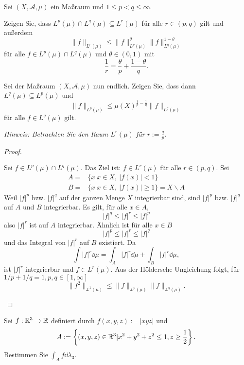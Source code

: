 \begin{Problem}
	Sei $(X, \mathcal{A},\mu)$ ein Maßraum und $1\le p<q\le\infty$.
	\begin{parts}
	\item Zeigen Sie, dass $L^p(\mu)\cap L^q(\mu)\subseteq L^r(\mu)$ f\"{u}r alle $r\in (p,q)$ gilt und außerdem
		\[
			\|f\|_{L^r(\mu)}\le \|f\|_{L^p(\mu)}^\theta \|f\|_{L^q(\mu)}^{1-\theta}
		\] 
		f\"{u}r alle $f\in L^p(\mu)\cap L^q(\mu)$ und $\theta\in (0,1)$ mit
		\[
		\frac{1}{r}=\frac{\theta}{p}+\frac{1-\theta}{q}
		.\] 
	\item Sei der Maßraum $(X,\mathcal{A},\mu)$ nun endlich. Zeigen Sie, dass dann $L^q(\mu)\subseteq L^p(\mu)$ und
		\[
			\|f\|_{L^p(\mu)}\le \mu(X)^{\frac{1}{p}-\frac{1}{q}}\|f\|_{L^q(\mu)}
		\] 
		f\"{u}r alle $f\in L^q(\mu)$ gilt.

		\emph{Hinweis: Betrachten Sie den Raum $L^r(\mu)$ f\"{u}r $r:=\frac{q}{p}$.}
	\end{parts}
\end{Problem}
\begin{proof}
	\begin{parts}
	\item Sei $f\in L^p(\mu)\cap L^q(\mu)$. Das Ziel ist: $f\in L^r(\mu)$ f\"{u}r alle $r\in (p,q)$. Sei
\begin{align*}
	A=&\{x|x\in X,~|f(x)|<1\} \\
	B=&\{x|x\in X,~|f(x)|\ge 1\}=X\backslash A
\end{align*}
Weil $|f|^p$ bzw. $|f|^q$ auf der ganzen Menge $X$ integrierbar sind, sind $|f|^p$ bzw. $|f|^q$ auf $A$ und $B$ integrierbar. Es gilt, f\"{u}r alle $x\in A$,
\[
|f|^q \le |f|^r \le |f|^p
\]
also $|f|^r$ ist auf $A$ integrierbar. Ähnlich ist f\"{u}r alle $x\in B$ 
\[
|f|^p\le |f|^r\le |f|^q
\]
und das Integral von $|f|^r$ auf $B$ existiert. Da
\[
	\int |f|^r\dd{\mu}=\int_A |f|^r\dd{\mu}+\int_B |f|^r\dd{\mu}
,\]
ist $|f|^r$ integrierbar und $f\in L^r(\mu)$. Aus der Höldersche Ungleichung folgt, f\"{u}r $1 / p + 1 / q = 1, p,q\in [1,\infty]$
\[
	\|f^2\|_{\mathcal{L}^1(\mu)}\le \|f\|_{\mathcal{L}^p(\mu)}\|f\|_{\mathcal{L}^q(\mu)}
.\] 
	\end{parts}
\end{proof}
\begin{Problem}
	Sei $f:\mathbb{R}^3\to \mathbb{R}$ definiert durch $f(x,y,z):=|xyz|$ und
	\[
		A:=\left\{ (x,y,z)\in \mathbb{R}^3|x^2+y^2+z^2\le 1, z\ge \frac{1}{2} \right\} 
	.\] 
	Bestimmen Sie $\int_A f\dd{\lambda_3}$.
\end{Problem}
